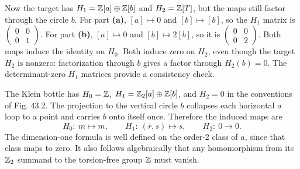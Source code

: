 Now the target has $H_1=\mathbb{Z}[a]\oplus\mathbb{Z}[b]$ and $H_2=\mathbb{Z}[T]$, but the maps still factor through the circle $b$.
For part \textbf{(a)}, $[a]\mapsto0$ and $[b]\mapsto[b]$, so the $H_1$ matrix is $\begin{pmatrix}0&0\\0&1\end{pmatrix}$.
For part \textbf{(b)}, $[a]\mapsto0$ and $[b]\mapsto2[b]$, so it is $\begin{pmatrix}0&0\\0&2\end{pmatrix}$.
Both maps induce the identity on $H_0$. Both induce zero on $H_2$, even though the target $H_2$ is nonzero: factorization through $b$ gives a factor through $H_2(b)=0$. The determinant-zero $H_1$ matrices provide a consistency check.

The Klein bottle has $H_0=\mathbb{Z}$, $H_1=\mathbb{Z}_2[a]\oplus\mathbb{Z}[b]$, and $H_2=0$ in the conventions of Fig. 43.2. The projection to the vertical circle $b$ collapses each horizontal $a$ loop to a point and carries $b$ onto itself once.
Therefore the induced maps are
\[
H_0:\ m\mapsto m,\qquad
H_1:\ (\overline r,s)\mapsto s,\qquad
H_2:\ 0\longrightarrow0.
\]
The dimension-one formula is well defined on the order-2 class of $a$, since that class maps to zero. It also follows algebraically that any homomorphism from its $\mathbb{Z}_2$ summand to the torsion-free group $\mathbb{Z}$ must vanish.
